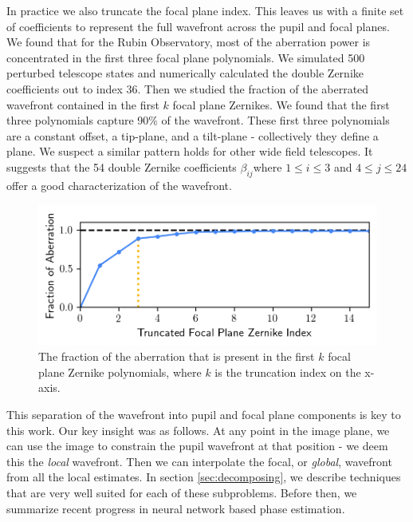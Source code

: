 In practice we also truncate the focal plane index. This leaves us with a finite set of coefficients to represent the full wavefront across the pupil and focal planes. We found that for the Rubin Observatory, most of the aberration power is concentrated in the first three focal plane polynomials. We simulated 500 perturbed telescope states and numerically calculated the double Zernike coefficients out to index 36. Then we studied the fraction of the aberrated wavefront contained in the first $k$ focal plane Zernikes. We found that the first three polynomials capture 90\% of the wavefront. These first three polynomials are a constant offset, a tip-plane, and a tilt-plane - collectively they define a plane. We suspect a similar pattern holds for other wide field telescopes. It suggests that the 54 double Zernike coefficients $\beta_{ij}$where $1 \leq i \leq 3$ and $4 \leq j \leq 24$ offer a good characterization of the wavefront.

\begin{figure}[hbt!]
\centering
\includegraphics[width=14cm, keepaspectratio]{figs/new_paradigm/truncated.png}
\caption[Aberration Power in Focal Plane Zernikes]{The fraction of the aberration that is present in the first $k$ focal plane Zernike polynomials, where $k$ is the truncation index on the x-axis.}
\label{fig:truncated}
\end{figure}

This separation of the wavefront into pupil and focal plane components is key to this work. Our key insight was as follows. At any point in the image plane, we can use the image to constrain the pupil wavefront at that position - we deem this the \textit{local} wavefront. Then we can interpolate the focal, or \textit{global}, wavefront from all the local estimates. In section \ref{sec:decomposing}, we describe techniques that are very well suited for each of these subproblems. Before then, we summarize recent progress in neural network based phase estimation.

